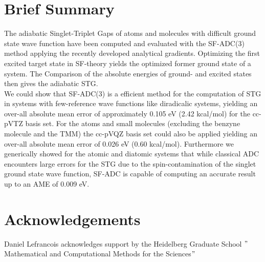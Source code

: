 \documentclass[aip,graphicx,amsmath,reprint]{revtex4-1}
\begin{document}
\section{Brief Summary}
The adiabatic Singlet-Triplet Gaps of atoms and molecules with difficult ground state wave function have been computed and evaluated with the SF-ADC(3) method applying the recently developed analytical gradients. Optimizing the first excited target state in SF-theory yields the optimized former ground state of a system. The Comparison of the absolute energies of ground- and excited states then gives the adiabatic STG.\\
We could show that SF-ADC(3) is a efficient method for the computation of STG in systems with few-reference wave functions like diradicalic systems, yielding an over-all absolute mean error of approximately 0.105 eV (2.42 kcal/mol) for the cc-pVTZ basis set. For the atoms and small molecules (excluding the benzyne molecule and the TMM) the cc-pVQZ basis set could also be applied yielding an over-all absolute mean error of 0.026 eV (0.60 kcal/mol). Furthermore we generically showed for the atomic and diatomic systems that while classical ADC encounters large errors for the STG due to the spin-contamination of the singlet ground state wave function, SF-ADC is capable of computing an accurate result up to an AME of 0.009 eV. 

\section{Acknowledgements}
Daniel Lefrancois acknowledges support by the Heidelberg Graduate School $"$Mathematical and Computational Methods for the Sciences$"$




\end{document}
